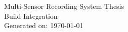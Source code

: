\documentclass[11pt]{report}
\begin{document}
\begin{titlepage}
  \centering
  {\LARGE Multi-Sensor Recording System Thesis\\[1ex]}
  {\large Build Integration}\\[2ex]
  {\large Generated on: \today}
\end{titlepage}

\tableofcontents
\clearpage








\clearpage


\appendix
\clearpage










\end{document}
